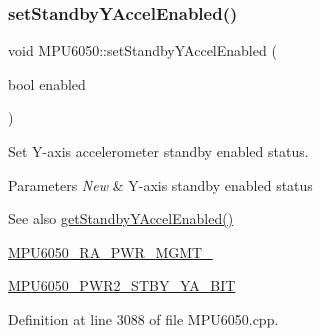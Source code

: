 \begin{DoxyCode}{0}

\end{DoxyCode}
\mbox{\label{classMPU6050_a7ce7d3299479eb66518acf0697132835}} 
\subsubsection{\texorpdfstring{setStandbyYAccelEnabled()}{setStandbyYAccelEnabled()}}
{\footnotesize\ttfamily void M\+P\+U6050\+::set\+Standby\+Y\+Accel\+Enabled (\begin{DoxyParamCaption}\item[{bool}]{enabled }\end{DoxyParamCaption})}

Set Y-\/axis accelerometer standby enabled status. 
\begin{DoxyParams}{Parameters}
{\em New} & Y-\/axis standby enabled status \\
\hline
\end{DoxyParams}
\begin{DoxySeeAlso}{See also}
\mbox{\hyperlink{classMPU6050_a104f2ec438d745f8fdeec202bae09b48}{get\+Standby\+Y\+Accel\+Enabled()}} 

\mbox{\hyperlink{MPU6050_8h_aace6ce286da4d5f8c8f5ba6f80688e13}{M\+P\+U6050\+\_\+\+R\+A\+\_\+\+P\+W\+R\+\_\+\+M\+G\+M\+T\+\_}} 

\mbox{\hyperlink{MPU6050_8h_affa59453badce23273e2a6470da072d3}{M\+P\+U6050\+\_\+\+P\+W\+R2\+\_\+\+S\+T\+B\+Y\+\_\+\+Y\+A\+\_\+\+B\+IT}} 
\end{DoxySeeAlso}


Definition at line 3088 of file M\+P\+U6050.\+cpp.


